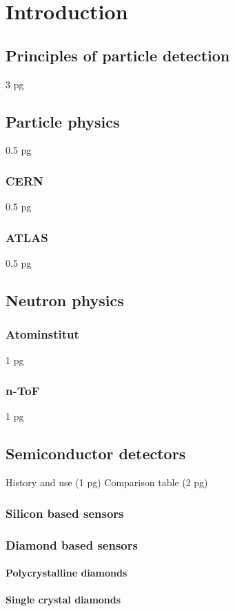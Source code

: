 \chapter{Introduction}


\section{Principles of particle detection}
 3 pg


\section{Particle physics}
0.5 pg
\subsection{CERN}
0.5 pg
\subsection{ATLAS}
0.5 pg

\section{Neutron physics}
\subsection{Atominstitut}
1 pg
\subsection{n-ToF}
1 pg


\section{Semiconductor detectors}
History and use (1 pg)
Comparison table (2 pg)

\subsection{Silicon based sensors}

\subsection{Diamond based sensors}
\subsubsection{Polycrystalline diamonds}
\subsubsection{Single crystal diamonds}
